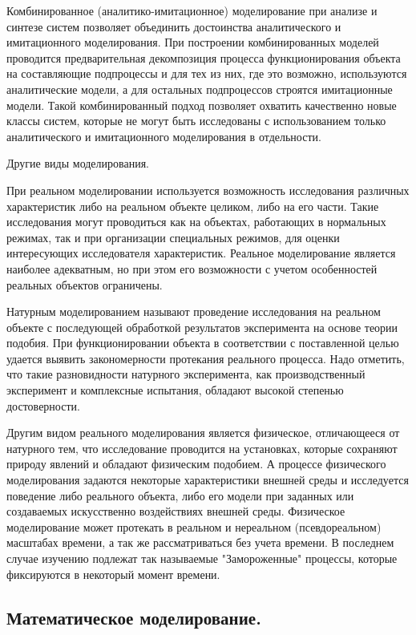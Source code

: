     Комбинированное (аналитико-имитационное) моделирование при анализе и синтезе систем позволяет объединить достоинства аналитического и имитационного моделирования. При построении комбинированных моделей проводится предварительная декомпозиция процесса функционирования объекта на составляющие подпроцессы и для тех из них, где это возможно, используются аналитические модели, а для остальных подпроцессов строятся имитационные модели. Такой комбинированный подход позволяет охватить качественно новые классы систем, которые не могут быть исследованы с использованием только аналитического и имитационного моделирования в отдельности.

    Другие виды моделирования.

    При реальном моделировании используется возможность исследования различных характеристик либо на реальном объекте целиком, либо на его части. Такие исследования могут проводиться как на объектах, работающих в нормальных режимах, так и при организации специальных режимов, для оценки интересующих исследователя характеристик. Реальное моделирование является наиболее адекватным, но при этом его возможности с учетом особенностей реальных объектов ограничены.

    Натурным моделированием называют проведение исследования на реальном объекте с последующей обработкой результатов эксперимента на основе теории подобия. При функционировании объекта в соответствии с поставленной целью удается выявить закономерности протекания реального процесса. Надо отметить, что такие разновидности натурного эксперимента, как производственный эксперимент и комплексные испытания, обладают высокой степенью достоверности.

    Другим видом реального моделирования является физическое, отличающееся от натурного тем, что исследование проводится на установках, которые сохраняют природу явлений и обладают физическим подобием. А процессе физического моделирования задаются некоторые характеристики внешней среды и исследуется поведение либо реального объекта, либо его модели при заданных или создаваемых искусственно воздействиях внешней среды. Физическое моделирование может протекать в реальном и нереальном (псевдореальном) масштабах времени, а так же рассматриваться без учета времени. В последнем случае изучению подлежат так называемые "Замороженные" процессы, которые фиксируются в некоторый момент времени.

\subsection{Математическое моделирование.}

